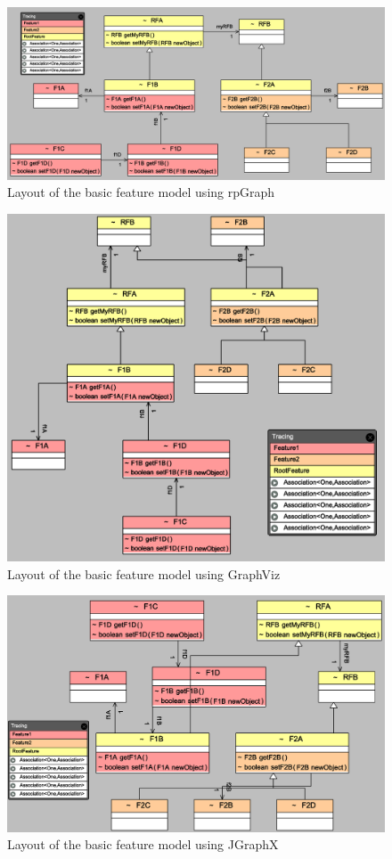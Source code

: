 \begin{figure}
	\centering
    \includegraphics[width=1\linewidth]{exrp.PNG}
	\caption{Layout of the basic feature model using rpGraph}
    \label{rpBasic}
\end{figure}
\begin{figure}
	\centering
    \includegraphics[width=1\linewidth]{exgv.PNG}
	\caption{Layout of the basic feature model using GraphViz}
    \label{gvBasic}
\end{figure}
\begin{figure}
	\centering
    \includegraphics[width=1\linewidth]{exgx.PNG}
	\caption{Layout of the basic feature model using JGraphX}
    \label{gxBasic}
\end{figure}

